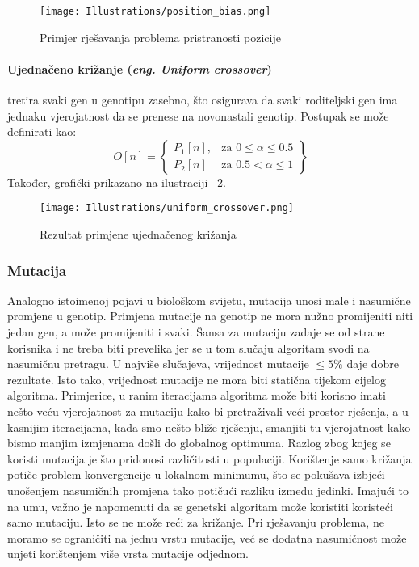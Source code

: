 \begin{figure}
	\texttt{[image: Illustrations/position\_bias.png]}
	\caption{Primjer rješavanja problema pristranosti pozicije}
	\label{fig:position_bias}
\end{figure}

\paragraph{Ujednačeno križanje (\emph{eng. Uniform crossover})}
tretira svaki gen u genotipu zasebno, što osigurava da svaki roditeljski gen ima jednaku vjerojatnost da se prenese na novonastali genotip.
Postupak se može definirati kao:
\[
	O[n] = \left\{\begin{array}{lr}
			P_1[n], & \text{za } 0 \leq \alpha \leq 0.5 \\
			P_2[n] & \text{za } 0.5 < \alpha \leq 1
		\end{array}\right\}
\]
Također, grafički prikazano na ilustraciji ~\ref{fig:uniform_crossover}.

\begin{figure}
	\texttt{[image: Illustrations/uniform\_crossover.png]}
	\caption{Rezultat primjene ujednačenog križanja}
	\label{fig:uniform_crossover}
\end{figure}

\subsubsection{Mutacija}
Analogno istoimenoj pojavi u biološkom svijetu, mutacija unosi male i nasumične promjene u genotip.
Primjena mutacije na genotip ne mora nužno promijeniti niti jedan gen, a može promijeniti i svaki.
Šansa za mutaciju zadaje se od strane korisnika i ne treba biti prevelika jer se u tom slučaju algoritam svodi na nasumičnu pretragu.
U najviše slučajeva, vrijednost mutacije $\leq 5\%$ daje dobre rezultate.
Isto tako, vrijednost mutacije ne mora biti statična tijekom cijelog algoritma.
Primjerice, u ranim iteracijama algoritma može biti korisno imati nešto veću vjerojatnost za mutaciju kako bi pretraživali veći prostor rješenja, a u kasnijim iteracijama, kada smo nešto bliže rješenju, smanjiti tu vjerojatnost kako bismo manjim izmjenama došli do globalnog optimuma.
Razlog zbog kojeg se koristi mutacija je što pridonosi različitosti u populaciji.
Korištenje samo križanja potiče problem konvergencije u lokalnom minimumu, što se pokušava izbjeći unošenjem nasumičnih promjena tako potičući razliku između jedinki.
Imajući to na umu, važno je napomenuti da se genetski algoritam može koristiti koristeći samo mutaciju.
Isto se ne može reći za križanje.
Pri rješavanju problema, ne moramo se ograničiti na jednu vrstu mutacije, već se dodatna nasumičnost može unjeti korištenjem više vrsta mutacije odjednom.


